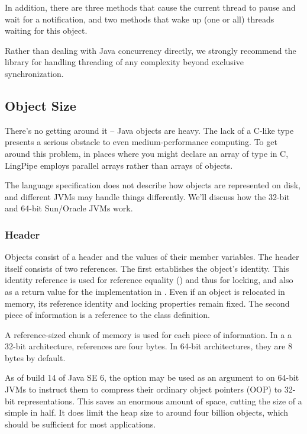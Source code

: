 In addition, there are three  methods that cause the
current thread to pause and wait for a notification, and two
 methods that wake up (one or all) threads waiting
for this object.  

Rather than dealing with Java concurrency directly, we strongly
recommend the  library for handling
threading of any complexity beyond exclusive synchronization.

\subsection{Object Size}

There's no getting around it -- Java objects are heavy.  The lack of a
C-like  type presents a serious obstacle to even
medium-performance computing.  To get around this problem, in places
where you might declare an array of  type in C, LingPipe
employs parallel arrays rather than arrays of objects.

The language specification does not describe how objects are
represented on disk, and different JVMs may handle things differently.
We'll discuss how the 32-bit and 64-bit Sun/Oracle JVMs work.

\subsubsection{Header}

Objects consist of a header and the values of their member variables.
The header itself consists of two references.  The first establishes
the object's identity.  This identity reference is used for reference
equality (\code{==}) and thus for locking, and also as a return value
for the  implementation in .  Even if an
object is relocated in memory, its reference identity and locking
properties remain fixed.  The second piece of information is a
reference to the class definition.

A reference-sized chunk of memory is used for each piece of
information.  In a a 32-bit architecture, references are four bytes.
In 64-bit architectures, they are 8 bytes by default.  

As of build 14 of Java SE 6, the  option
may be used as an argument to  on 64-bit JVMs to instruct
them to compress their ordinary object pointers (OOP) to 32-bit
representations.  This saves an enormous amount of space, cutting the
size of a simple  in half.  It does limit the heap size
to around four billion objects, which should be sufficient for most
applications.

